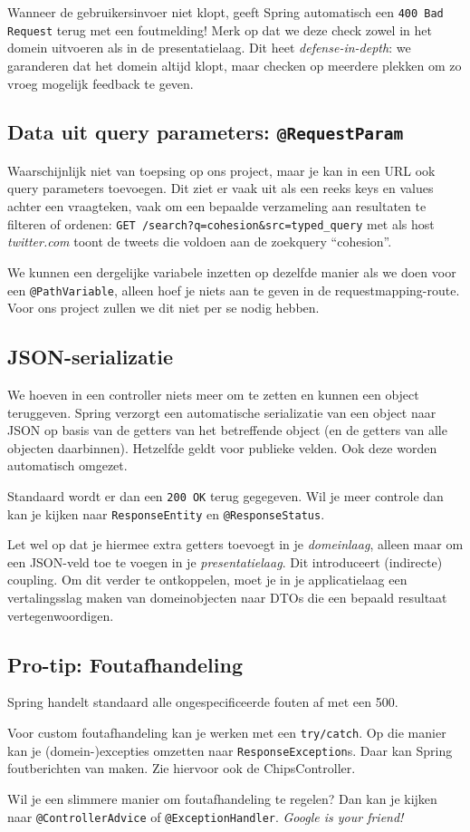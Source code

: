 Wanneer de gebruikersinvoer niet klopt, geeft Spring automatisch 
een \texttt{400 Bad Request} terug met een foutmelding!
Merk op dat we deze check zowel in het domein uitvoeren als in de presentatielaag.
Dit heet \textit{defense-in-depth}: we garanderen dat het domein altijd klopt,
maar checken op meerdere plekken om zo vroeg mogelijk feedback te geven. 

\subsection{Data uit query parameters: \texttt{@RequestParam}}
Waarschijnlijk niet van toepsing op ons project,
maar je kan in een URL ook query parameters toevoegen.
Dit ziet er vaak uit als een reeks keys en values achter een vraagteken,
vaak om een bepaalde verzameling aan resultaten te filteren of ordenen:
\texttt{GET /search?q=cohesion\&src=typed\_query} met als host \textit{twitter.com} 
toont de tweets die voldoen aan de zoekquery ``cohesion''.

We kunnen een dergelijke variabele inzetten op dezelfde manier als we doen voor 
een \texttt{@PathVariable}, alleen hoef je niets aan te geven in de 
requestmapping-route. Voor ons project zullen we dit niet per se nodig hebben.

\subsection{JSON-serializatie}
We hoeven in een controller niets meer om te zetten en kunnen een object 
teruggeven. Spring verzorgt een automatische serializatie van een object naar JSON
op basis van de getters van het betreffende object (en de getters van alle objecten daarbinnen).
Hetzelfde geldt voor publieke velden. Ook deze worden automatisch omgezet.

Standaard wordt er dan een \texttt{200 OK} terug gegegeven.
Wil je meer controle dan kan je kijken naar \texttt{ResponseEntity}
en \texttt{@ResponseStatus}.

Let wel op dat je hiermee extra getters toevoegt in je \textit{domeinlaag}, alleen maar 
om een JSON-veld toe te voegen in je \textit{presentatielaag}. Dit introduceert (indirecte)
coupling. Om dit verder te  ontkoppelen, moet je in je applicatielaag een vertalingsslag maken van domeinobjecten naar DTOs die een bepaald
resultaat vertegenwoordigen.

\subsection{Pro-tip: Foutafhandeling}
Spring handelt standaard alle ongespecificeerde fouten af met een 500.

Voor custom foutafhandeling kan je werken met een \texttt{try/catch}. 
Op die manier kan je (domein-)excepties omzetten naar
\texttt{ResponseException}s. Daar kan Spring foutberichten van maken.
Zie hiervoor ook de ChipsController.

Wil je een slimmere manier om foutafhandeling te regelen? Dan kan je 
kijken naar \texttt{@ControllerAdvice} of \texttt{@ExceptionHandler}.
\textit{Google is your friend!}
